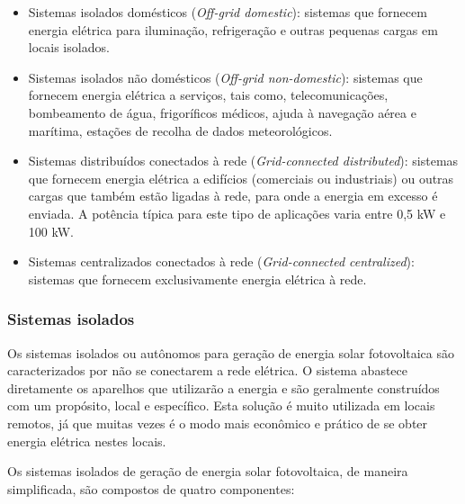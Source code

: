 \begin{itemize}
        \item Sistemas isolados dom\'esticos (\textit{Off-grid domestic}): sistemas que fornecem energia el\'etrica para ilumina\c{c}\~ao, refrigera\c{c}\~ao e outras pequenas cargas em locais isolados. 
	\item Sistemas isolados n\~ao dom\'esticos (\textit{Off-grid non-domestic}): sistemas que fornecem energia el\'etrica a servi\c{c}os, tais como, telecomunica\c{c}\~oes, bombeamento de \'agua, frigor\'ificos m\'edicos, ajuda \`a navega\c{c}\~ao a\'erea e mar\'itima, esta\c{c}\~oes de recolha de dados meteorol\'ogicos.
	\item Sistemas distribu\'idos conectados \`a rede (\textit{Grid-connected distributed}): sistemas que fornecem energia el\'etrica a edif\'icios (comerciais ou industriais) ou outras cargas que tamb\'em est\~ao ligadas \`a rede, para onde a energia em excesso \'e enviada. A pot\^encia t\'ipica para este tipo de aplica\c{c}\~oes varia entre 0,5 kW e 100 kW.
	\item Sistemas centralizados conectados \`a rede (\textit{Grid-connected centralized}): sistemas que fornecem exclusivamente energia el\'etrica \`a rede.
\end{itemize}

\subsubsection{Sistemas isolados}

Os sistemas isolados ou aut\^onomos para gera\c{c}\~ao de energia solar fotovoltaica s\~ao caracterizados por n\~ao se conectarem a rede el\'etrica. O sistema abastece diretamente os aparelhos que utilizar\~ao a energia e s\~ao geralmente constru\'idos com um prop\'osito, local e espec\'ifico. Esta solu\c{c}\~ao \'e muito utilizada em locais remotos, j\'a que muitas vezes \'e o modo mais econ\^omico e pr\'atico de se obter energia el\'etrica nestes locais.

	Os sistemas isolados de gera\c{c}\~ao de energia solar fotovoltaica, de maneira simplificada, s\~ao compostos de quatro componentes:

